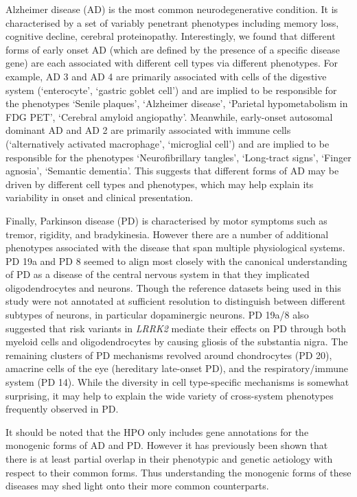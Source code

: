 \documentclass[
sn-nature
]{sn-jnl}
\begin{document}
Alzheimer disease (AD) is the most common neurodegenerative condition.
It is characterised by a set of variably penetrant phenotypes including
memory loss, cognitive decline, cerebral proteinopathy. Interestingly,
we found that different forms of early onset AD (which are defined by
the presence of a specific disease gene) are each associated with
different cell types via different phenotypes. For example, AD 3 and AD
4 are primarily associated with cells of the digestive system
(`enterocyte', `gastric goblet cell') and are implied to be responsible
for the phenotypes `Senile plaques', `Alzheimer disease', `Parietal
hypometabolism in FDG PET', `Cerebral amyloid angiopathy'. Meanwhile,
early-onset autosomal dominant AD and AD 2 are primarily associated with
immune cells (`alternatively activated macrophage', `microglial cell')
and are implied to be responsible for the phenotypes `Neurofibrillary
tangles', `Long-tract signs', `Finger agnosia', `Semantic dementia'.
This suggests that different forms of AD may be driven by different cell
types and phenotypes, which may help explain its variability in onset
and clinical presentation.

Finally, Parkinson disease (PD) is characterised by motor symptoms such
as tremor, rigidity, and bradykinesia. However there are a number of
additional phenotypes associated with the disease that span multiple
physiological systems. PD 19a and PD 8 seemed to align most closely with
the canonical understanding of PD as a disease of the central nervous
system in that they implicated oligodendrocytes and neurons. Though the
reference datasets being used in this study were not annotated at
sufficient resolution to distinguish between different subtypes of
neurons, in particular dopaminergic neurons. PD 19a/8 also suggested
that risk variants in \emph{LRRK2} mediate their effects on PD through
both myeloid cells and oligodendrocytes by causing gliosis of the
substantia nigra. The remaining clusters of PD mechanisms revolved
around chondrocytes (PD 20), amacrine cells of the eye (hereditary
late-onset PD), and the respiratory/immune system (PD 14). While the
diversity in cell type-specific mechanisms is somewhat surprising, it
may help to explain the wide variety of cross-system phenotypes
frequently observed in PD.

It should be noted that the HPO only includes gene annotations for the
monogenic forms of AD and PD. However it has previously been shown that
there is at least partial overlap in their phenotypic and genetic
aetiology with respect to their common forms. Thus understanding the
monogenic forms of these diseases may shed light onto their more common
counterparts.
\end{document}
